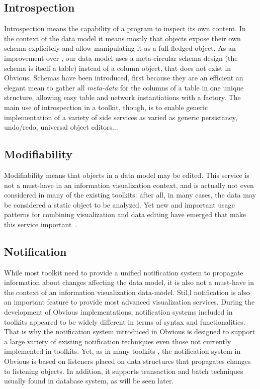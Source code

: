 \subsection{Introspection}

Introspection means the capability of a program to inspect its own content. In the context of the data model it means mostly that objects expose their own schema explicitely and allow manipulating it as a full fledged object. As an improvement over \cite{DesignPatternsIV}, our data model uses a meta-circular schema design (the schema is itself a table) instead of a column object, that does not exist in Obvious. Schemas have been introduced, first because they are an efficient an elegant mean to gather all \emph{meta-data} for the columns of a table in one unique structure, allowing easy table and network instantiations with a factory. The main use of introspection in a toolkit, though, is to enable generic implementation of a variety of side services as varied as generic persistancy, undo/redo, universal object editors...

\subsection{Modifiability}

Modifiability means that objects in a data model may be edited. This service is not a must-have in an information visualization context, and is actually not even considered in many of the existing toolkits: after all, in many cases, the data may be considered a static object to be analyzed.
Yet new and important usage patterns for combining visualization and data editing have emerged that make this service important~\cite{Discovery3}.

\subsection{Notification}

While most toolkit need to provide a unified notification system to propagate information about changes affecting the data model, it is also not a must-have in the context of an information visualization data-model. Stil,l notification is also an important feature to provide most advanced visualization services. During the development of Obvious implementations, notification systems included in toolkits appeared to be widely different in terms of syntax and functionalities.  That is why the notification system introduced in Obvious is designed to support a large variety of existing notification techniques even those not currently implemented in toolkits. Yet, as in many toolkits \cite{Prefuse,InfoVis,jung2003,Discovery1}, the notification system in Obvious is based on listeners placed on data structures that propagates changes to listening objects. In addition, it supports transaction and batch techniques usually found in database system, as will be seen later.

